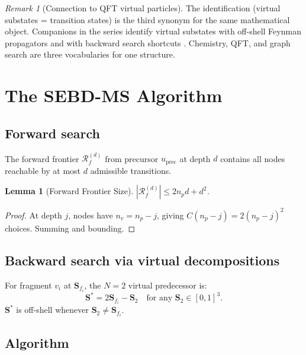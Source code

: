 \documentclass[twocolumn,10pt,a4paper]{article}
\theoremstyle{thmstyle}
\newtheorem{lemma}[theorem]{Lemma}
\theoremstyle{definition}
\theoremstyle{remark}
\newtheorem{remark}[theorem]{Remark}
\newcommand{\Sv}{\mathbf{S}}
\newcommand{\Reachf}{\mathcal{R}_f}
\begin{document}
\begin{remark}[Connection to QFT virtual particles]
The identification (virtual substates = transition states) is the third
synonym for the same mathematical object. Companions in the series
identify virtual substates with off-shell Feynman propagators
\citep{companion:virtual} and with backward search shortcuts
\citep{companion:trajectory}. Chemistry, QFT, and graph search are three
vocabularies for one structure.
\end{remark}

\section{The SEBD-MS Algorithm}
\label{sec:algorithm}

\subsection{Forward search}

The forward frontier $\Reachf^{(d)}$ from precursor $u_\text{prec}$ at
depth $d$ contains all nodes reachable by at most $d$ admissible transitions.

\begin{lemma}[Forward Frontier Size]
$|\Reachf^{(d)}| \leq 2n_p d + d^2$.
\end{lemma}

\begin{proof}
At depth $j$, nodes have $n_v = n_p - j$, giving $C(n_p-j) = 2(n_p-j)^2$
choices. Summing and bounding.
\end{proof}

\subsection{Backward search via virtual decompositions}

For fragment $v_i$ at $\Sv_{f_i}$, the $N=2$ virtual predecessor is:
\begin{equation}
\Sv^* = 2\Sv_{f_i} - \Sv_2
\quad \text{for any } \Sv_2 \in [0,1]^3.
\label{eq:virtual_pred}
\end{equation}
$\Sv^*$ is off-shell whenever $\Sv_2 \neq \Sv_{f_i}$.

\subsection{Algorithm}
\end{document}
